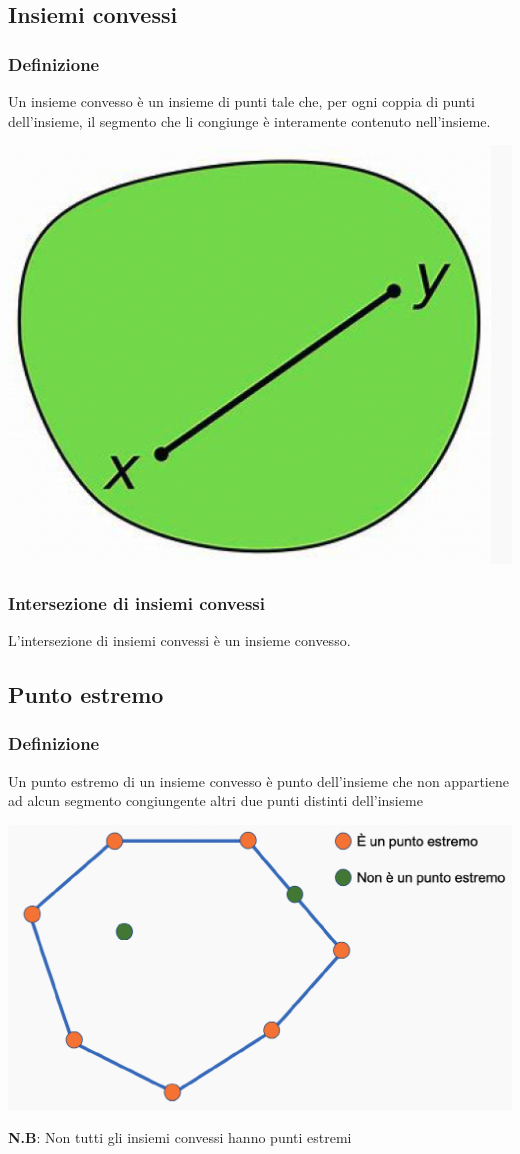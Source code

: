\documentclass[12pt,a4paper]{article}
\begin{document}
\subsection{Insiemi convessi}
\subsubsection{Definizione}
Un insieme convesso è un insieme di punti tale che, per ogni coppia di punti dell’insieme, il segmento che li congiunge è interamente contenuto nell’insieme.
\begin{center}
\includegraphics[width=0.3\columnwidth]{img/ins_covesso.png}
\end{center}
\subsubsection{Intersezione di insiemi convessi}
L'intersezione di insiemi convessi è un insieme convesso.

\subsection{Punto estremo}
\subsubsection{Definizione}
Un punto estremo di un insieme convesso è punto dell’insieme che non appartiene ad alcun segmento congiungente altri due punti distinti dell’insieme\\
\begin{center}
\includegraphics[width=0.3\columnwidth]{img/p_estremo.png}
\end{center}
\textbf{N.B}: Non tutti gli insiemi convessi hanno punti estremi
\end{document}
